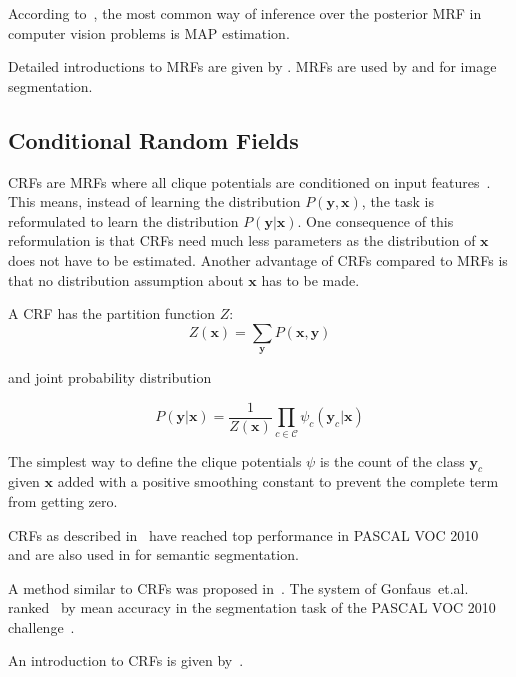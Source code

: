 According to~\cite{murphy2012machine}, the most common way of inference over
the posterior \gls{MRF} in computer vision problems is \gls{MAP} estimation.


Detailed introductions to \glspl{MRF} are given by
\cite{blake2011markov,murphy2012machine}. \glspl{MRF} are used by \cite{zhang2001segmentation} and \cite{moser2012markov}
for image segmentation.





\subsection{Conditional Random Fields}\label{subsec:conditional-random-fields}

\Glspl{CRF} are \glspl{MRF} where all clique potentials are conditioned on
input features~\cite{murphy2012machine}. This means, instead of learning the
distribution $P(\mathbf{y}, \mathbf{x})$, the task is reformulated to learn the
distribution $P(\mathbf{y}| \mathbf{x})$. One consequence of this reformulation
is that \glspl{CRF} need much less parameters as the distribution of
$\mathbf{x}$ does not have to be estimated. Another advantage of \glspl{CRF}
compared to \glspl{MRF} is that no distribution assumption about $\mathbf{x}$
has to be made.

A \gls{CRF} has the partition function $Z$:
\[Z(\mathbf{x}) = \sum_{\mathbf{y}} P(\mathbf{x}, \mathbf{y})\]

and joint probability distribution

\[P(\mathbf{y} | \mathbf{x}) = \frac{1}{Z(\mathbf{x})} \prod_{c \in \mathcal{C}} \psi_c(\mathbf{y}_c | \mathbf{x})\]

The simplest way to define the clique potentials $\psi$ is the count of the
class $\mathbf{y}_c$ given $\mathbf{x}$ added with a positive smoothing
constant to prevent the complete term from getting zero.

\Glspl{CRF} as described in~\cite{associative09} have reached top performance
in PASCAL VOC 2010~\cite{VOC2010Results} and are also used in
\cite{multiscale04,shotton2006textonboost} for semantic segmentation.

A method similar to \glspl{CRF} was proposed in~\cite{gonfaus2010harmony}.
The system of Gonfaus~et.al. ranked~ by mean accuracy in the segmentation
task of the PASCAL VOC 2010 challenge~\cite{everingham2010pascal}.

An introduction to \glspl{CRF} is given by~\cite{sutton2011introduction}.
